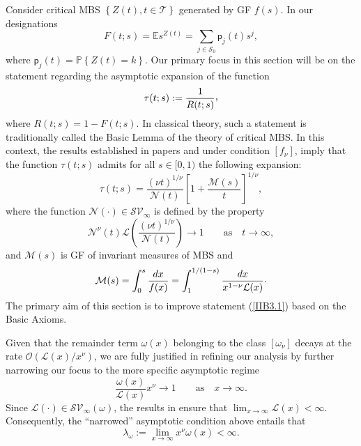 \documentclass[10pt,reqno]{amsart}
\theoremstyle{definition}
\numberwithin{equation}{section}
\begin{document}
    Consider critical MBS $\left\{Z(t),t\in\mathcal{T}\right\}$ generated by GF $f(s)$. In our designations
\[
    F(t;s)=\mathbb{E}{{s}^{Z(t)}}=\sum_{j\in{\mathcal{S}}_{0}}{\textsf{p}_{j}(t){s}^{j}},
\]
    where ${\textsf{p}_{j}(t)}=\mathbb{P}\left\{Z(t)=k\right\}$. Our primary focus in this section will be
    on the statement regarding the asymptotic expansion of the function
\[
    \tau(t;s):=\frac{1}{R(t;s)} {\raise1.5pt\hbox{,}}
\]
    where $R(t;s)=1-F(t;s)$. In classical theory, such a statement is traditionally called the Basic
    Lemma of the theory of critical MBS. In this context, the results established in papers {\cite{ImUfa21}}
    and {\cite{ImMJMS17}} under condition $[{f_{\nu}}]$, imply that the function $\tau(t;s)$ admits
    for all $s\in[0,1)$ the following expansion:
\begin{equation}                              \label{IIB3.1}
    \tau(t;s)=\frac{{(\nu t)}^{1/{\nu}}}{\mathcal{N}(t)}{{\left[1+\frac{\mathcal{M}(s)}{t}\right]}^{1/{\nu}}},
\end{equation}
    where the function $\mathcal{N}(\cdot)\in\mathcal{S}{{\mathcal{V}}_{\infty}}$ is defined by the property
\begin{equation}                              \label{IIB3.2}
    {{\mathcal{N}}^{\nu}}(t)\mathcal{L}\left(\frac{{(\nu{t})}^{1/{\nu}}}{\mathcal{N}(t)}\right)\to{1}
    \qquad {\text{as}} \quad {t\to\infty},
\end{equation}
    and $\mathcal{M}(s)$ is GF of invariant measures of MBS and
\[
    \mathcal{M}(s)=\int_{0}^{s}{\frac{dx}{f(x)}}=
    \int_{1}^{{1}/{(1-s)}}{\frac{dx}{{x^{1-\nu}}\mathcal{L}(x)}} {\raise1.5pt\hbox{.}}
\]
    The primary aim of this section is to improve statement {(\ref{IIB3.1})} based on the Basic Axioms.

    Given that the remainder term $\omega(x)$ belonging to the class $[{{\omega}_{\nu}}]$ decays at the rate
    $\mathcal{O}\left({\mathcal{L}(x)}/{{x^{\nu}}}\right)$, we are fully justified in refining our analysis
    by further narrowing our focus to the more specific asymptotic regime
\[
    \frac{\omega (x)}{\mathcal{L}(x)}{{x}^{\nu }}\to{1}   \qquad {\text{as}} \quad {x\to\infty}.
\]
    Since $\mathcal{L}(\cdot)\in{{\mathcal{SV}}_{\infty}}(\omega)$, the results in {\cite{ImMDPI24}} ensure that ${{\lim}_{x\to\infty}}\mathcal{L}(x)<\infty$. Consequently, the ``narrowed'' asymptotic condition above entails that
\begin{equation}                              \label{IIB3.3}
    {{\lambda}_{\omega}}:=\lim_{x\to\infty}{x^{\nu}}\omega(x)<\infty.
\end{equation}
\end{document}
